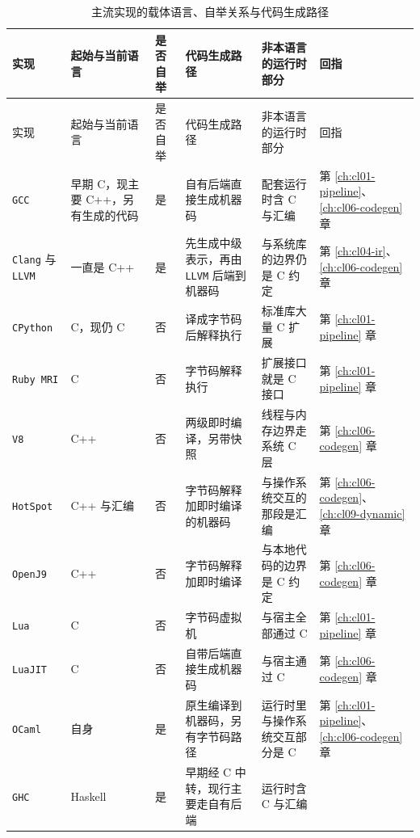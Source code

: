 \documentclass[12pt,a4paper,fontset=fandol]{ctexbook}
\newcommand{\Lang}[1]{\textsf{#1}}
\newcommand{\CL}{\Lang{C}}
\newcommand{\CPP}{\Lang{C++}}
\newcommand{\Tool}[1]{\texttt{#1}}
\begin{document}
\begin{longtable}{@{}>{\raggedright\arraybackslash}p{} >{\raggedright\arraybackslash}p{} >{\raggedright\arraybackslash}p{} >{\raggedright\arraybackslash}p{} >{\raggedright\arraybackslash}p{} >{\raggedright\arraybackslash}p{}@{}}
\caption{主流实现的载体语言、自举关系与代码生成路径}\label{tab:apC-selfhost}\\
\toprule
实现 & 起始与当前语言 & 是否自举 & 代码生成路径 & 非本语言的运行时部分 & 回指 \\
\midrule
\endfirsthead
\toprule
实现 & 起始与当前语言 & 是否自举 & 代码生成路径 & 非本语言的运行时部分 & 回指 \\
\midrule
\endhead
\bottomrule
\endfoot
\Tool{GCC} & 早期 \CL{}，现主要 \CPP{}，另有生成的代码 & 是 &
自有后端直接生成机器码 & 配套运行时含 \CL{} 与汇编 &
第 \ref{ch:cl01-pipeline}、\ref{ch:cl06-codegen} 章 \\
\Tool{Clang} 与 \Tool{LLVM} & 一直是 \CPP{} & 是 &
先生成中级表示，再由 \Tool{LLVM}{} 后端到机器码 &
与系统库的边界仍是 \CL{} 约定 &
第 \ref{ch:cl04-ir}、\ref{ch:cl06-codegen} 章 \\
\Tool{CPython} & \CL{}，现仍 \CL{} & 否 &
译成字节码后解释执行 & 标准库大量 \CL{} 扩展 &
第 \ref{ch:cl01-pipeline} 章 \\
\Tool{Ruby MRI} & \CL{} & 否 &
字节码解释执行 & 扩展接口就是 \CL{} 接口 &
第 \ref{ch:cl01-pipeline} 章 \\
\Tool{V8} & \CPP{} & 否 &
两级即时编译，另带快照 &
线程与内存边界走系统 \CL{} 层 &
第 \ref{ch:cl06-codegen} 章 \\
\Tool{HotSpot} & \CPP{} 与汇编 & 否 &
字节码解释加即时编译的机器码 &
与操作系统交互的那段是汇编 &
第 \ref{ch:cl06-codegen}、\ref{ch:cl09-dynamic} 章 \\
\Tool{OpenJ9} & \CPP{} & 否 &
字节码解释加即时编译 &
与本地代码的边界是 \CL{} 约定 &
第 \ref{ch:cl06-codegen} 章 \\
\Tool{Lua} & \CL{} & 否 &
字节码虚拟机 & 与宿主全部通过 \CL{} &
第 \ref{ch:cl01-pipeline} 章 \\
\Tool{LuaJIT} & \CL{} & 否 &
自带后端直接生成机器码 & 与宿主通过 \CL{} &
第 \ref{ch:cl06-codegen} 章 \\
\Tool{OCaml} & 自身 & 是 &
原生编译到机器码，另有字节码路径 &
运行时里与操作系统交互部分是 \CL{} &
第 \ref{ch:cl01-pipeline}、\ref{ch:cl06-codegen} 章 \\
\Tool{GHC} & \Lang{Haskell} & 是 &
早期经 \CL{} 中转，现行主要走自有后端 &
运行时含 \CL{} 与汇编 &

\end{longtable}
\end{document}
